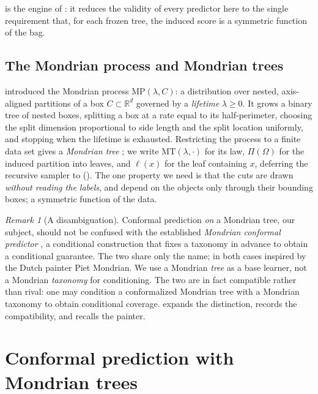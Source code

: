 \documentclass[twoside]{article}
\numberwithin{equation}{section}
\theoremstyle{plain}
\theoremstyle{definition}
\theoremstyle{remark}
\newtheorem{remark}[theorem]{Remark}
\begin{document}
         is the engine of : it reduces the validity of every predictor here to the single requirement that, for each frozen tree, the induced score is a symmetric function of the bag.

    \subsection{The Mondrian process and Mondrian trees}\label{sec:bg-mondrian}
        \citet{roy2009mondrian} introduced the Mondrian process $\mathrm{MP}(\lambda, C)$: a
distribution over nested, axis-aligned partitions of a box $C \subset \mathbb{R}^{d}$
governed by a \emph{lifetime} $\lambda \ge 0$. It grows a binary tree of nested boxes,
splitting a box at a rate equal to its half-perimeter, choosing the split dimension
proportional to side length and the split location uniformly, and stopping when the
lifetime is exhausted. Restricting the process to a finite data set gives a
\emph{Mondrian tree} \citep{lakshminarayanan2014mondrian}; we write
$\mathrm{MT}(\lambda, \cdot)$ for its law, $\Pi(\Omega)$ for the induced partition into
leaves, and $\ell(x)$ for the leaf containing $x$, deferring the recursive sampler to
 (). The one property we need is that the
cuts are drawn \emph{without reading the labels}, and depend on the objects only through
their bounding boxes; a symmetric function of the data.

\begin{remark}[A disambiguation]\label{rem:disambig}
Conformal prediction \emph{on} a Mondrian tree, our subject, should not be confused
with the established \emph{Mondrian conformal predictor} \citep[Section 4.6]{alrw2}, a
conditional construction that fixes a taxonomy in advance to obtain a
conditional guarantee. The two share only the name; in both cases inspired by the Dutch painter Piet Mondrian. We use a Mondrian \emph{tree}
as a base learner, not a Mondrian \emph{taxonomy} for conditioning. The two are in
fact compatible rather than rival: one may condition a conformalized Mondrian tree with
a Mondrian taxonomy to obtain conditional coverage.  expands the
distinction, records the compatibility, and recalls the painter.
\end{remark}


\section{Conformal prediction with Mondrian trees}\label{sec:trees}
\end{document}
